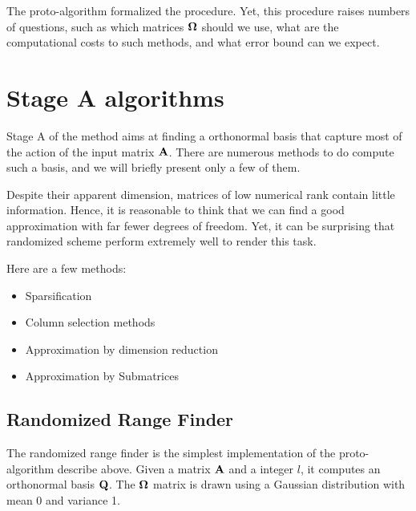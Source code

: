 \documentclass[onecolumn,12pt]{article}
\begin{document}
The proto-algorithm formalized the procedure. Yet, this procedure raises
numbers of questions, such as which matrices $\bold{\Omega}$ should we use,
what are the computational costs to such methods, and what error bound can we
expect.

\section{Stage A algorithms}

Stage A of the method aims at finding a orthonormal basis that capture most of
the action of the input matrix $\bold{A}$. There are numerous methods to do
compute such a basis, and we will briefly present only a few of them.

Despite their apparent dimension, matrices of low numerical rank contain
little information. Hence, it is reasonable to think that we can find a good
approximation with far fewer degrees of freedom. Yet, it can be surprising
that randomized scheme perform extremely well to render this task.

Here are a few methods:

\begin{itemize}
\item Sparsification
\item Column selection methods
\item Approximation by dimension reduction
\item Approximation by Submatrices
\end{itemize}

\subsection{Randomized Range Finder}

The randomized range finder is the simplest implementation of the
proto-algorithm describe above. Given a matrix $\bold{A}$ and a integer $l$,
it computes an orthonormal basis $\bold{Q}$. The $\bold{\Omega}$ matrix is
drawn using a Gaussian distribution with mean 0 and variance 1.

\noindent{}
\end{document}
